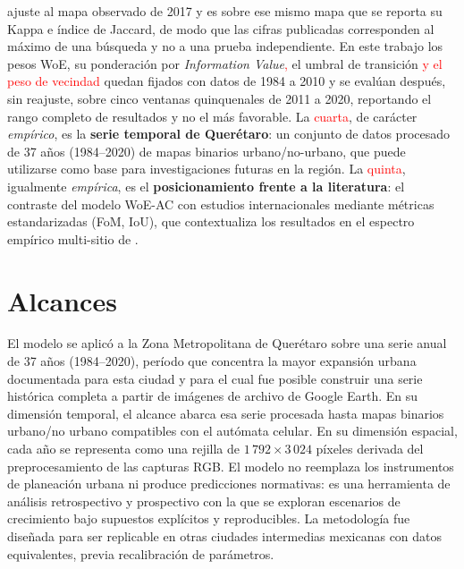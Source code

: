 ajuste al mapa observado de 2017 y es sobre ese mismo mapa que se reporta su Kappa e índice de Jaccard, de modo que las cifras publicadas corresponden al máximo de una búsqueda y no a una prueba independiente. En este trabajo los pesos WoE, su ponderación por \textit{Information Value}\textcolor{red}{,} el umbral de transición \textcolor{red}{y el peso de vecindad} quedan fijados con datos de 1984 a 2010 y se evalúan después, sin reajuste, sobre cinco ventanas quinquenales de 2011 a 2020, reportando el rango completo de resultados y no el más favorable. La \textcolor{red}{cuarta}, de carácter \textit{empírico}, es la \textbf{serie temporal de Querétaro}: un conjunto de datos procesado de 37 años (1984--2020) de mapas binarios urbano/no-urbano, que puede utilizarse como base para investigaciones futuras en la región. La \textcolor{red}{quinta}, igualmente \textit{empírica}, es el \textbf{posicionamiento frente a la literatura}: el contraste del modelo WoE-AC con estudios internacionales mediante métricas estandarizadas (FoM, IoU), que contextualiza los resultados en el espectro empírico multi-sitio de \textcite{pontius2008comparing}.


\section{Alcances}

El modelo se aplicó a la Zona Metropolitana de Querétaro sobre una serie anual de 37 años (1984--2020), período que concentra la mayor expansión urbana documentada para esta ciudad y para el cual fue posible construir una serie histórica completa a partir de imágenes de archivo de Google Earth. En su dimensión temporal, el alcance abarca esa serie procesada hasta mapas binarios urbano/no urbano compatibles con el autómata celular. En su dimensión espacial, cada año se representa como una rejilla de $1\,792 \times 3\,024$ píxeles derivada del preprocesamiento de las capturas RGB. El modelo no reemplaza los instrumentos de planeación urbana ni produce predicciones normativas: es una herramienta de análisis retrospectivo y prospectivo con la que se exploran escenarios de crecimiento bajo supuestos explícitos y reproducibles. La metodología fue diseñada para ser replicable en otras ciudades intermedias mexicanas con datos equivalentes, previa recalibración de parámetros.

